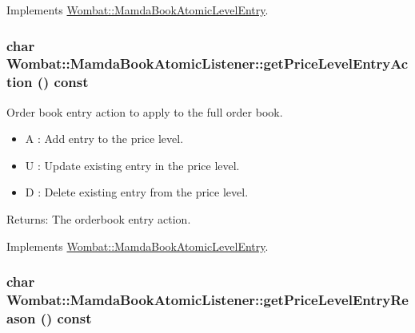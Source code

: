 Implements \hyperlink{classWombat_1_1MamdaBookAtomicLevelEntry_9c206e1b9ce877f5a5386dc79721aed6}{Wombat::Mamda\-Book\-Atomic\-Level\-Entry}.\hypertarget{classWombat_1_1MamdaBookAtomicListener_561b2a785ed0546d0d1d2097b77a4f91}{
\subsubsection[getPriceLevelEntryAction]{\setlength{\rightskip}{0pt plus 5cm}char Wombat::Mamda\-Book\-Atomic\-Listener::get\-Price\-Level\-Entry\-Action () const}}
\label{classWombat_1_1MamdaBookAtomicListener_561b2a785ed0546d0d1d2097b77a4f91}


Order book entry action to apply to the full order book. 

\begin{itemize}
\item A : Add entry to the price level. \item U : Update existing entry in the price level. \item D : Delete existing entry from the price level. \end{itemize}


\begin{Desc}
\item[Returns:]The orderbook entry action. \end{Desc}


Implements \hyperlink{classWombat_1_1MamdaBookAtomicLevelEntry_685db14a553ce94346b62f7d7b8b5b5a}{Wombat::Mamda\-Book\-Atomic\-Level\-Entry}.\hypertarget{classWombat_1_1MamdaBookAtomicListener_b7643da89cf38905b17b2bb8a2930f53}{
\subsubsection[getPriceLevelEntryReason]{\setlength{\rightskip}{0pt plus 5cm}char Wombat::Mamda\-Book\-Atomic\-Listener::get\-Price\-Level\-Entry\-Reason () const}}
\label{classWombat_1_1MamdaBookAtomicListener_b7643da89cf38905b17b2bb8a2930f53}


